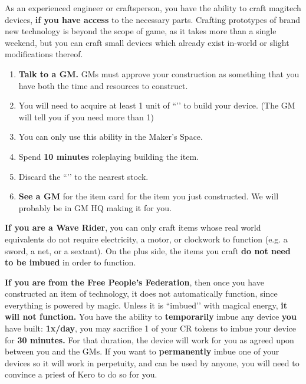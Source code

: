\documentclass[green]{GL2020}
\begin{document}
\name{\gMagitechCrafting{}}

As an experienced engineer or craftsperson, you have the ability to craft magitech devices, \textbf{if you have access} to the necessary parts. Crafting prototypes of brand new technology is beyond the scope of game, as it takes more than a single weekend, but you can craft small devices which already exist in-world or slight modifications thereof. 

\begin{enumerate}
  \item \textbf{Talk to a GM.} GMs must approve your construction as something that you have both the time and resources to construct.
  \item You will need to acquire at least 1 unit of ``\iMagitechParts{}’’ to build your device. (The GM will tell you if you need more than 1) 
  \item You can only use this ability in the Maker’s Space. 
  \item Spend \textbf{10 minutes} roleplaying building the item. 
  \item Discard the ``\iMagitechParts{}’’ to the nearest stock. 
  \item \textbf{See a GM} for the item card for the item you just constructed. We will probably be in GM HQ making it for you.
\end{enumerate}

\textbf{If you are a Wave Rider}, you can only craft items whose real world equivalents do not require electricity, a motor, or clockwork to function (e.g. a sword, a net, or a sextant). On the plus side, the items you craft \textbf{do not need to be imbued} in order to function. 

\textbf{If you are from the Free People's Federation}, then once you have constructed an item of technology, it does not automatically function, since everything is powered by magic. Unless it is ``imbued’’ with magical energy, \textbf{it will not function.} You have the ability to \textbf{temporarily} imbue any device \textbf{you} have built: \textbf{1x/day}, you may sacrifice 1 of your CR tokens to imbue your device for \textbf{30 minutes.} For that duration, the device will work for you as agreed upon between you and the GMs. If you want to \textbf{permanently} imbue one of your devices so it will work in perpetuity, and can be used by anyone, you will need to convince a priest of Kero to do so for you.
\end{document}
